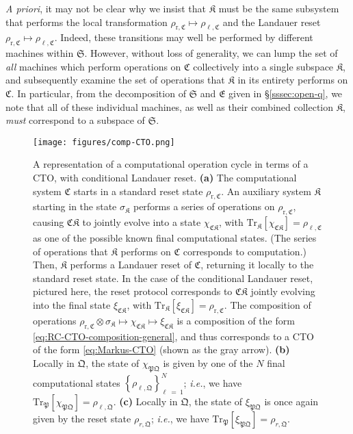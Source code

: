 \documentclass[preprints,article,accept,moreauthors,pdftex]{Definitions/mdpi}
\begin{document}
\begin{paracol}{2}
\emph{A priori}, it may not be clear why we insist that $\mathfrak{K}$ must be the same subsystem that performs the local transformation $\rho_{\mathrm{r},\mathfrak{C}}\mapsto\rho_{\ell,\mathfrak{C}}$ and the Landauer reset $\rho_{\mathrm{r},\mathfrak{C}}\mapsto\rho_{\ell,\mathfrak{C}}$. Indeed, these transitions may well be performed by different machines within $\mathfrak{S}$. However, without loss of generality, we can lump the set of \emph{all} machines which perform operations on $\mathfrak{C}$ collectively into a single subspace $\mathfrak{K}$, and subsequently examine the set of operations that $\mathfrak{K}$ in its entirety performs on $\mathfrak{C}$. In particular, from the decomposition of $\mathfrak{S}$ and $\mathfrak{E}$ given in \S\ref{sssec:open-q}, we note that all of these individual machines, as well as their combined collection $\mathfrak{K}$, \emph{must} correspond to a subspace of $\mathfrak{S}$.

\begin{figure}[h] 
    \centerline{\texttt{[image: figures/comp-CTO.png]}}
    \caption{A representation of a computational operation cycle in terms of a CTO, with conditional Landauer reset. \textbf{(a)} The computational system $\mathfrak{C}$ starts in a standard reset state $\rho_{\mathrm{r},\mathfrak{C}}$. An auxiliary system $\mathfrak{K}$ starting in the state $\sigma_{\mathfrak{K}}$ performs a series of operations on $\rho_{\mathrm{r},\mathfrak{C}}$, causing $\mathfrak{CK}$ to jointly evolve into a state $\chi_{\mathfrak{CK}}$, with $\mathrm{Tr}_{\mathfrak{K}}\left[\chi_{\mathfrak{CK}}\right] = \rho_{\ell,\mathfrak{C}}$ as one of the possible known final computational states. (The series of operations that $\mathfrak{K}$ performs on $\mathfrak{C}$ corresponds to computation.) Then, $\mathfrak{K}$ performs a Landauer reset of $\mathfrak{C}$, returning it locally to the standard reset state. In the case of the conditional Landauer reset, pictured here, the reset protocol corresponds to $\mathfrak{CK}$ jointly evolving into the final state $\xi_{\mathfrak{CK}}$, with $\mathrm{Tr}_{\mathfrak{K}}\left[\xi_{\mathfrak{CK}}\right] = \rho_{\mathrm{r},\mathfrak{C}}$. The composition of operations $\rho_{\mathrm{r},\mathfrak{C}}\otimes\sigma_{\mathfrak{K}}\mapsto\chi_{\mathfrak{CK}}\mapsto\xi_{\mathfrak{CK}}$ is a composition of the form \eqref{eq:RC-CTO-composition-general}, and thus corresponds to a CTO of the form \eqref{eq:Markus-CTO} (shown as the gray arrow). \textbf{(b)} Locally in $\mathfrak{Q}$, the state of $\chi_{\mathfrak{PQ}}$ is given by one of the $N$ final computational states $\left\{\rho_{\ell,\mathfrak{Q}}\right\}_{\ell\:=\:1}^{N}$; \emph{i.e.}, we have $\mathrm{Tr}_{\mathfrak{P}}\left[\chi_{\mathfrak{PQ}}\right] = \rho_{\ell,\mathfrak{Q}}$. \textbf{(c)} Locally in $\mathfrak{Q}$, the state of $\xi_{\mathfrak{PQ}}$ is once again given by the reset state $\rho_{r,\mathfrak{Q}}$; \emph{i.e.}, we have $\mathrm{Tr}_{\mathfrak{P}}\left[\xi_{\mathfrak{PQ}}\right] = \rho_{r,\mathfrak{Q}}$. \label{fig:cto-rc}}
\end{figure}


\end{paracol}
\end{document}
